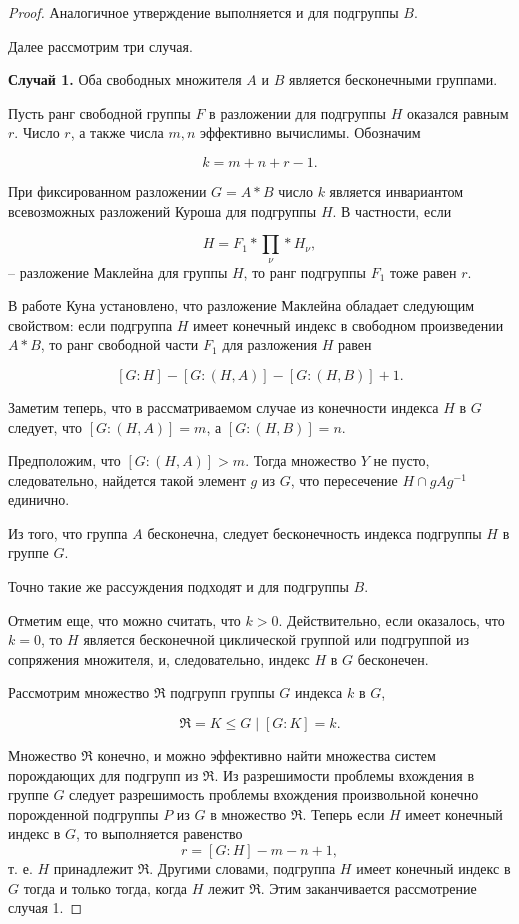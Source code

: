 \documentclass[twoside]{mfitjournal}
\begin{document}
\begin{proof}
Аналогичное утверждение выполняется и для подгруппы $B$.

Далее рассмотрим три случая.

\textbf{Случай 1.} Оба свободных множителя  $A$ и $B$ является бесконечными группами.

Пусть ранг свободной группы $F$ в разложении для подгруппы $H$ оказался равным $r$. Число $r$, а также числа $m, n$ эффективно вычислимы. Обозначим

\[
k = m+n+r-1.
\]

При фиксированном разложении $G = A \ast B$ число $k$ является инвариантом всевозможных разложений Куроша для подгруппы $H$. В частности, если 

\[
H=F_1\ast\prod\limits_{\nu}\ast H_\nu,
\]
–   разложение Маклейна для группы $H$, то ранг подгруппы $F_1$ тоже равен $r$.
 
В работе Куна \cite{Kuh} установлено, что разложение Маклейна обладает следующим свойством: если подгруппа $H$ имеет конечный индекс в свободном произведении $A \ast B$, то ранг свободной части $F_1$ для разложения $H$ равен 

\[
[G : H]-[G : (H, A)]-[G : (H, B)] + 1.
\]

Заметим теперь, что в рассматриваемом случае из конечности индекса $H$ в $G$ следует, что $[G: (H, A)] = m$, а $[G: (H, B)] = n$. 

Предположим, что $[G: (H, A)] > m$. Тогда множество $Y$ не пусто, следовательно, найдется такой элемент $g$ из $G$, что пересечение $H\cap gAg^{-1}$  единично.
 
Из того, что группа $A$ бесконечна, следует бесконечность индекса подгруппы $H$ в группе $G$. 

Точно такие же рассуждения подходят и для подгруппы $B$.

Отметим еще, что можно считать, что $k > 0$. Действительно, если оказалось, что $k = 0$, то $H$ является бесконечной циклической группой или подгруппой из сопряжения множителя, и, следовательно, индекс $H$ в $G$ бесконечен.

Рассмотрим множество $\Re$  подгрупп группы $G$ индекса $k$ в $G$, 

\[
\Re = {K\leq G \mid [G: K] = k}.
\]

Множество $ \Re $  конечно, и можно эффективно найти множества систем порождающих для подгрупп из $ \Re $. Из разрешимости проблемы вхождения в группе $G$ следует разрешимость проблемы вхождения произвольной конечно порожденной подгруппы $P$ из $G$ в множество $ \Re $. Теперь если $H$ имеет конечный индекс в $G$, то выполняется равенство
\[
r = [G: H]-m-n+1,
\]
т. е. $H$ принадлежит $ \Re $. Другими словами, подгруппа $H$ имеет конечный индекс в $G$ тогда и только тогда, когда $H$ лежит $\Re$. Этим заканчивается рассмотрение случая 1.


\end{proof}
\end{document}

